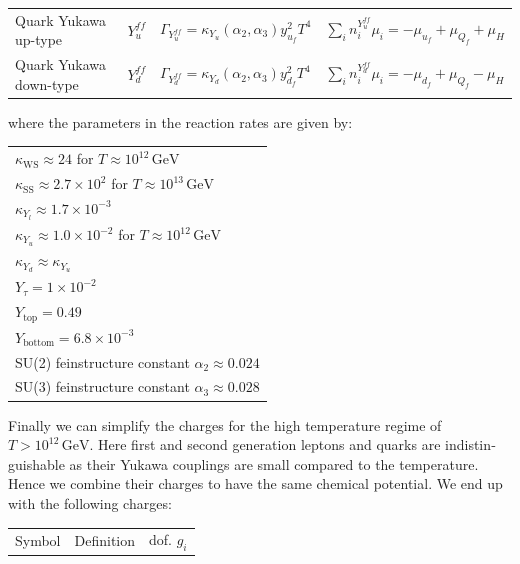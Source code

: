 \documentclass[master,       %
               twoside,        %
               BCOR10mm,       %
               english,ngerman, %
               ]{GAUBM}
\begin{document}
\begin{otherlanguage}{english}
\begin{table}[H]
\begin{center}
\begin{tabular}{llll}
			Quark Yukawa up-type & $Y_u^{ff}$ & $\Gamma_{Y_u^{ff}} = \kappa_{Y_u}(\alpha_2, \alpha_3) y_{u_f}^2 T^4$ & $ \sum_i n_i^{Y_u^{ff}} \mu_i = - \mu_{u_f} + \mu_{Q_f} + \mu_H$ \\
			Quark Yukawa down-type & $Y_d^{ff}$ & $\Gamma_{Y_d^{ff}} = \kappa_{Y_d}(\alpha_2, \alpha_3) y_{d_f}^2 T^4$ & $ \sum_i n_i^{Y_d^{ff}} \mu_i = - \mu_{d_f} + \mu_{Q_f} - \mu_H$ \\
		\end{tabular}
	\end{center}
	\label{tab:interactions_in_the_sm}
\end{table}
where the parameters in the reaction rates are given by:
\begin{table}[H]
	\begin{center}
		\begin{tabular}{l}
			$\kappa_\mathrm{WS} \approx 24$ for $T \approx 10^{12} \, \mathrm{GeV}$ \\
			$\kappa_\mathrm{SS} \approx 2.7 \times 10^2$ for $T \approx 10^{13} \, \mathrm{GeV}$ \\
			$\kappa_{Y_l} \approx 1.7 \times 10^{-3}$ \\
			$\kappa_{Y_u} \approx 1.0 \times 10^{-2}$ for $T \approx 10^{12} \, \mathrm{GeV}$ \\
			$\kappa_{Y_d} \approx \kappa_{Y_u}$ \\
			$Y_\tau = 1 \times 10^{-2}$ \\
			$Y_\mathrm{top} = 0.49$ \\
			$Y_\mathrm{bottom} = 6.8 \times 10^{-3}$ \\
			SU(2) feinstructure constant $\alpha_2 \approx 0.024$ \\
			SU(3) feinstructure constant $\alpha_3 \approx 0.028$ \\
		\end{tabular}
	\end{center}
\end{table}
Finally we can simplify the charges for the high temperature regime of $T > 10^{12} \, \mathrm{GeV}$. Here first and second generation leptons and quarks are indistinguishable as their Yukawa couplings are small compared to the temperature.
Hence we combine their charges to have the same chemical potential. We end up with the following charges:
\begin{table}[H]
	\begin{center}
		\begin{tabular}{lll}
			Symbol & Definition & dof. $g_i$ \\

\end{tabular}
\end{center}
\end{table}
\end{otherlanguage}
\end{document}
